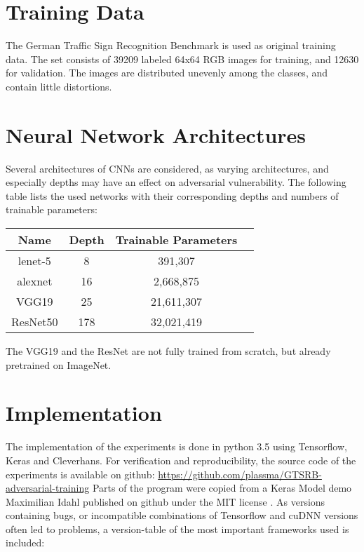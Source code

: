 \documentclass[draft,final]{vutinfth} %
\begin{document}
\section{Training Data}

The German Traffic Sign Recognition Benchmark is used as original training data. The set consists of 39209 labeled 64x64 RGB images for training, and 12630 for validation.
The images are distributed unevenly among the classes, and contain little distortions.


\section{Neural Network Architectures}

Several architectures of CNNs are considered, as varying architectures, and especially depths may have an effect on adversarial vulnerability.
The following table lists the used networks with their corresponding depths and numbers of trainable parameters:

\begin{table}[h]
  \centering
  \begin{tabular}{cccc}
    \toprule
		Name    		& Depth		& Trainable Parameters\\
    \midrule
		lenet-5			&	8				& 391,307							\\
		alexnet 		& 16			& 2,668,875						\\
		VGG19				& 25			& 21,611,307					\\
		ResNet50		& 178			& 32,021,419					\\
    
    \bottomrule
  \end{tabular}
\end{table}


The VGG19 and the ResNet are not fully trained from scratch, but already pretrained on ImageNet.

\section{Implementation}

The implementation of the experiments is done in python 3.5 using Tensorflow, Keras and Cleverhans.
For verification and reproducibility, the source code of the experiments is available on github: \url{https://github.com/plassma/GTSRB-adversarial-training}
Parts of the program were copied from a Keras Model demo Maximilian Idahl published on github under the MIT license \cite{Idahl2018}.
As versions containing bugs, or incompatible combinations of Tensorflow and cuDNN versions often led to problems, a version-table of the most important frameworks used is included:
\end{document}
